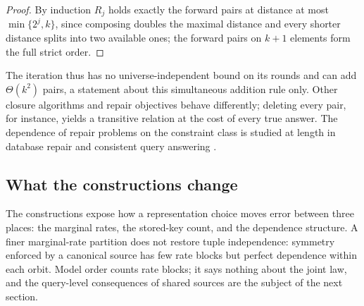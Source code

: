 \begin{proof}
By induction $R_j$ holds exactly the forward pairs at distance at most $\min\{2^j,
k\}$, since composing doubles the maximal distance and every shorter distance
splits into two available ones; the forward pairs on $k + 1$ elements form the
full strict order.
\end{proof}

The iteration thus has no universe-independent bound on its rounds and can add
$\Theta(k^2)$ pairs, a statement about this simultaneous addition rule only. Other
closure algorithms and repair objectives behave differently; deleting every pair,
for instance, yields a transitive relation at the cost of every true answer. The
dependence of repair problems on the constraint class is studied at length in
database repair and consistent query answering \parencite{bertossi-2011}.

\subsection*{What the constructions change}

The constructions expose how a representation choice moves error between three
places: the marginal rates, the stored-key count, and the dependence structure. A
finer marginal-rate partition does not restore tuple independence: symmetry
enforced by a canonical source has few rate blocks but perfect dependence within
each orbit. Model order counts rate blocks; it says nothing about the joint law,
and the query-level consequences of shared sources are the subject of the next
section.
